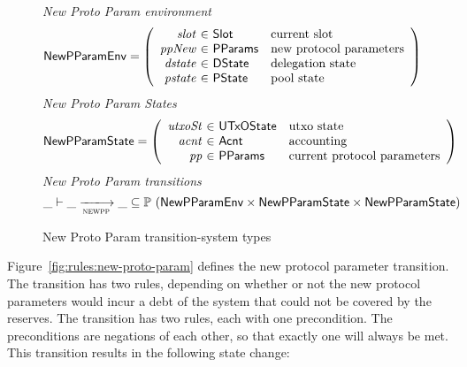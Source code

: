 \begin{figure}[htb]
  \emph{New Proto Param environment}
  \begin{equation*}
    \NewPParamEnv =
    \left(
      \begin{array}{r@{~\in~}ll}
        \var{slot} & \Slot & \text{current slot}\\
        \var{ppNew} & \PParams & \text{new protocol parameters}\\
        \var{dstate} & \DState & \text{delegation state}\\
        \var{pstate} & \PState & \text{pool state}\\
      \end{array}
    \right)
  \end{equation*}
  \emph{New Proto Param States}
  \begin{equation*}
    \NewPParamState =
    \left(
      \begin{array}{r@{~\in~}ll}
        \var{utxoSt} & \UTxOState & \text{utxo state}\\
        \var{acnt} & \Acnt & \text{accounting}\\
        \var{pp} & \PParams & \text{current protocol parameters}\\
      \end{array}
    \right)
  \end{equation*}
  \emph{New Proto Param transitions}
  \begin{equation*}
    \_ \vdash
    \var{\_} \trans{newpp}{} \var{\_}
    \subseteq \powerset (\NewPParamEnv \times \NewPParamState \times \NewPParamState)
  \end{equation*}
  \caption{New Proto Param transition-system types}
  \label{fig:ts-types:new-proto-param}
\end{figure}


Figure~\ref{fig:rules:new-proto-param} defines the new protocol parameter transition.
The transition has two rules, depending on whether or not the new protocol parameters
would incur a debt of the system that could not be covered by the reserves.
The transition has two rules, each with one precondition. The preconditions are
negations of each other, so that exactly one will always be met.
This transition results in the following state change:

